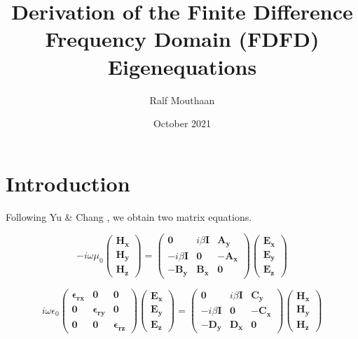\documentclass[]{article}
\begin{document}
	
\title{Derivation of the Finite Difference Frequency Domain (FDFD) Eigenequations}
\author{Ralf Mouthaan}
\date{October 2021}
\maketitle

\section{Introduction}

Following Yu \& Chang \cite{Yu2004}, we obtain two matrix equations.

\begin{equation}
-i \omega \mu_0
\begin{pmatrix}
\mathbf{H_x} \\
\mathbf{H_y} \\
\mathbf{H_z}
\end{pmatrix}
=
\begin{pmatrix}
\mathbf{0} & i \beta \mathbf{I} & \mathbf{A_y} \\
-i \beta \mathbf{I} & \mathbf{0} & -\mathbf{A_x} \\
-\mathbf{B_y} & \mathbf{B_x} & \mathbf{0}
\end{pmatrix}
\begin{pmatrix}
\mathbf{E_x} \\
\mathbf{E_y} \\
\mathbf{E_z}
\end{pmatrix}
\label{eq:FiniteDiffMatrixa}
\end{equation}

\begin{equation}
i \omega \epsilon_0
\begin{pmatrix}
\mathbf{\epsilon_{rx}} & \mathbf{0} & \mathbf{0} \\
\mathbf{0} & \mathbf{\epsilon_{ry}} & \mathbf{0} \\
\mathbf{0} & \mathbf{0} & \mathbf{\epsilon_{rz}}
\end{pmatrix}
\begin{pmatrix}
\mathbf{E_x} \\
\mathbf{E_y} \\
\mathbf{E_z}
\end{pmatrix}
=
\begin{pmatrix}
\mathbf{0} & i \beta \mathbf{I} & \mathbf{C_y} \\
-i \beta \mathbf{I} & \mathbf{0} & -\mathbf{C_x} \\
-\mathbf{D_y} & \mathbf{D_x} & \mathbf{0} 
\end{pmatrix}
\begin{pmatrix}
\mathbf{H_x} \\
\mathbf{H_y} \\
\mathbf{H_z}
\end{pmatrix}
\label{eq:FiniteDiffMatrixb}
\end{equation}
\end{document}

